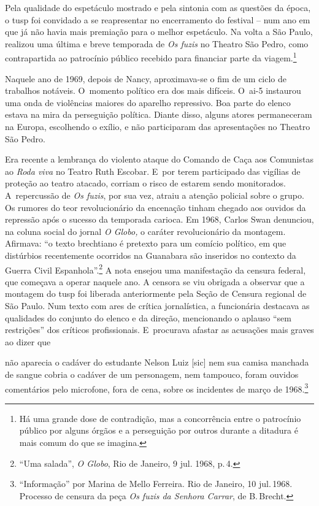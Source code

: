 {Pela qualidade do espetáculo mostrado e pela sintonia com as questões da
época, o {\sc tusp} foi convidado a se reapresentar no encerramento do
festival -- num ano em que já não havia mais premiação para o melhor
espetáculo. Na volta a São Paulo, realizou uma última e breve temporada
de {\it Os fuzis} no Theatro São Pedro, como contrapartida ao patrocínio
público recebido para financiar parte da viagem.\footnote{Há uma grande
  dose de contradição, mas a concorrência entre o patrocínio público por
  alguns órgãos e a perseguição por outros durante a ditadura é mais comum
  do que se imagina.}

Naquele ano de 1969, depois de Nancy, aproximava-se o fim de um ciclo de
trabalhos notáveis. O~momento político era dos mais difíceis. O~{\sc ai}-5 instaurou uma onda de violências maiores do
aparelho repressivo. Boa parte do elenco estava na mira da perseguição
política. Diante disso, alguns atores permaneceram na Europa, escolhendo
o exílio, e não participaram das apresentações no Theatro São Pedro.

Era recente a lembrança do violento ataque do Comando de Caça aos
Comunistas ao {\it Roda viva} no Teatro Ruth Escobar. E~por terem
participado das vigílias de proteção ao teatro atacado, corriam o risco
de estarem sendo monitorados. A~repercussão de {\it Os fuzis}, por sua
vez, atraiu a atenção policial sobre o grupo. Os rumores do teor
revolucionário da encenação tinham chegado aos ouvidos da repressão após
o sucesso da temporada carioca. Em 1968, Carlos Swan denunciou, na
coluna social do jornal {\it O Globo,} o caráter revolucionário da
montagem. Afirmava: “o texto brechtiano é pretexto para um comício
político, em que distúrbios recentemente ocorridos na Guanabara são
inseridos no contexto da Guerra Civil Espanhola”.\footnote{“Uma salada”,
  {\it O Globo}, Rio de Janeiro, 9 jul. 1968, p.\,4.} A nota ensejou uma
manifestação da censura federal, que começava a operar naquele ano. A
censora se viu obrigada a observar que a montagem do {\sc tusp} foi liberada
anteriormente pela Seção de Censura regional de São Paulo. Num texto com
ares de crítica jornalística, a funcionária destacava as qualidades do
conjunto do elenco e da direção, mencionando o aplauso “sem restrições”
dos críticos profissionais. E~procurava afastar as acusações mais graves
ao dizer que

\startblockquote
não aparecia o cadáver do estudante Nelson Luiz {[}sic{]} nem sua camisa
manchada de sangue cobria o cadáver de um personagem, nem tampouco,
foram ouvidos comentários pelo microfone, fora de cena, sobre os
incidentes de março de 1968.\footnote{“Informação” por Marina de Mello
  Ferreira. Rio de Janeiro, 10 jul.\,1968. Processo de censura da
  peça {\it Os fuzis da Senhora Carrar}, de B.\,Brecht.}
\stopblockquote

}
